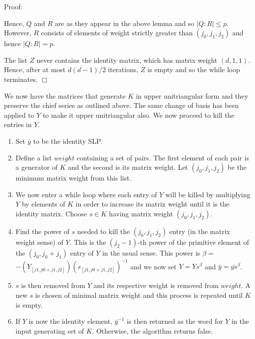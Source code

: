 \documentclass[12pt]{report}
\newenvironment{proof}{\normalsize {\sc Proof}:}{{\hfill $\Box$ \\}}
\begin{document}
\begin{proof}

Hence, $Q$ and $R$ are as they appear in the above lemma and so $|Q : R| \leq p$. However, $R$ consists of elements of weight strictly greater than $(j_0, j_1, j_2)$ and hence $|Q : R| = p$.

The list $Z$ never contains the identity matrix, which has matrix weight $(d, 1, 1)$. Hence, after at most $d(d-1)/2$ iterations, $Z$ is empty and so the while loop terminates.
\end{proof}

We now have the matrices that generate $K$ in upper unitriangular form and they preserve the chief series as outlined above. The same change of basis has been applied to $Y$ to make it upper unitriangular also. We now proceed to kill the entries in $Y$.

\begin{enumerate}
\item Set $\bar{y}$ to be the identity SLP.
\item Define a list $weight$ containing a set of pairs. The first element of each pair is a generator of $K$ and the second is its matrix weight. Let $(j_0, j_1, j_2)$ be the minimum matrix weight from this list.
\item We now enter a while loop where each entry of $Y$ will be killed by multiplying $Y$ by elements of $K$ in order to increase its matrix weight until it is the identity matrix. Choose $s \in K$ having matrix weight $(j_0, j_1, j_2)$.
\item Find the power of $s$ needed to kill the $(j_0, j_1, j_2)$ entry (in the matrix weight sense) of $Y$. This is the $(j_2 - 1)$-th power of the primitive element of the  $(j_0, j_0 + j_1)$ entry of $Y$ in the usual sense. This power is $\beta = $ $-(Y_{[j1, j0 + j1, j2]})(s_{[j1, j0 + j1, j2]})^{-1}$ and we now set $Y = Y s^\beta$ and $\bar{y} = \bar{y s}^\beta$.
\item $s$ is then removed from $Y$ and its respective weight is removed from $weight$. A new $s$ is chosen of minimal matrix weight and this process is repeated until $K$ is empty.
\item If $Y$ is now the identity element, $\bar{y}^{-1}$ is then returned as the word for $Y$ in the input generating set of $K$. Otherwise, the algorithm returns false.
\end{enumerate}
\end{document}
